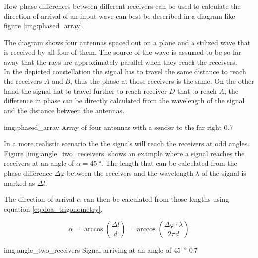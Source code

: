 How phase differences between different receivers
can be used to calculate the direction of arrival of an
input wave can best be described in a diagram like
figure \ref{img:phased_array}.

The diagram shows four antennas spaced out on a plane
and a stilized wave that is received by all four of them.
The source of the wave is assumed to be so far away that
the rays are approximately parallel when they reach the receivers. \\

In the depicted constellation the signal has to travel the
same distance to reach the receivers $A$ and $B$, thus the
phase at those receivers is the same.
On the other hand the signal hat to travel further to reach
receiver $D$ that to reach $A$, the difference in phase can
be directly calculated from the wavelength of the signal and
the distance between the antennas.

             {img:phased_array}
             {Array of four antennas with a sender to the far right}
             {0.7}

In a more realistic scenario the the signals will reach the
receivers at odd angles. Figure \ref{img:angle_two_receivers}
shows an example where a signal reaches the receivers at an
angle of $\alpha=\SI{45}{\degree}$. The length that can be calculated
from the phase difference $\Delta \varphi$ between the receivers and
the wavelength $\lambda$ of the signal is marked as $\Delta l$.

The direction of arrival $\alpha$ can then be calculated from
those lengths using equation \ref{eq:doa_trigonometry}.

\begin{equation}
  \label{eq:doa_trigonometry}
  \alpha
  = \arccos \left( \frac{\Delta l}{d} \right)
  = \arccos \left( \frac{\Delta \varphi \cdot \lambda}{2 \pi d} \right)
\end{equation}

             {img:angle_two_receivers}
             {Signal arriving at an angle of \SI{45}{\degree}}
             {0.7}

